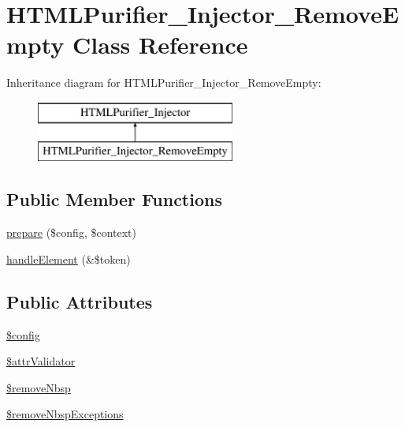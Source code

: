 \hypertarget{classHTMLPurifier__Injector__RemoveEmpty}{\section{H\+T\+M\+L\+Purifier\+\_\+\+Injector\+\_\+\+Remove\+Empty Class Reference}
\label{classHTMLPurifier__Injector__RemoveEmpty}
}
Inheritance diagram for H\+T\+M\+L\+Purifier\+\_\+\+Injector\+\_\+\+Remove\+Empty\+:\begin{figure}[H]
\begin{center}
\leavevmode
\includegraphics[height=2.000000cm]{classHTMLPurifier__Injector__RemoveEmpty}
\end{center}
\end{figure}
\subsection*{Public Member Functions}
\begin{DoxyCompactItemize}
\item 
\hyperlink{classHTMLPurifier__Injector__RemoveEmpty_adc11f10a8c059b866315936091c2dd31}{prepare} (\$config, \$context)
\item 
\hyperlink{classHTMLPurifier__Injector__RemoveEmpty_ac66ca6b1d471561991e38f556379de44}{handle\+Element} (\&\$token)
\end{DoxyCompactItemize}
\subsection*{Public Attributes}
\begin{DoxyCompactItemize}
\item 
\hyperlink{classHTMLPurifier__Injector__RemoveEmpty_ac36aae9401621e42b25964c310783f08}{\$config}
\item 
\hyperlink{classHTMLPurifier__Injector__RemoveEmpty_a9499c8d7739ae3441a18b40dc99edcb5}{\$attr\+Validator}
\item 
\hyperlink{classHTMLPurifier__Injector__RemoveEmpty_a3f3efa1b98fd2d89e36ba49193714f55}{\$remove\+Nbsp}
\item 
\hyperlink{classHTMLPurifier__Injector__RemoveEmpty_a13fb5587daceb1290725075c52981012}{\$remove\+Nbsp\+Exceptions}
\end{DoxyCompactItemize}

